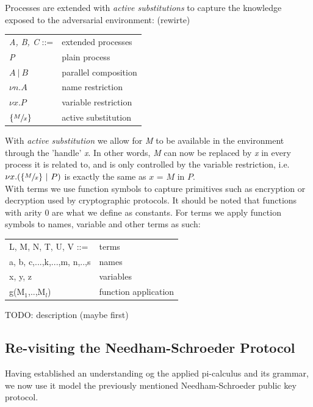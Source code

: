 Processes are extended with \textit{active substitutions} to capture the knowledge exposed to the
adversarial environment: (rewirte)
\begin{center}
	\begin{tabular} { l l }
 		\textit{A, B, C} ::= & extended processes \\ 
 		\textit{P} & plain process \\  
 		$A\ |\ B$ & parallel composition \\
		$\nu n.A$ & name restriction \\
		$\nu x.P$ & variable restriction \\
		$\{ \sfrac{M}{x} \}$ & active substitution
	\end{tabular}
\end{center}
With \textit{active substitution} we allow for \textit{M} to be available in the environment through the 'handle' \textit{x}. In other words, \textit{M} can now be replaced by \textit{x} in every process it is related to, and is only controlled by the variable restriction, i.e. $\nu x.(\{\sfrac{M}{x}\}\ |\ P)$ is exactly the same as $x$ = $M$ in $P.$\\ 

With terms we use function symbols to capture primitives such as encryption or decryption used by cryptographic protocols. It should be noted that functions with arity 0 are what we define as constants.
For terms we apply function symbols to names, variable and other terms as such: 
\begin{center}
	\begin{tabular} { l l }
 		L, M, N, T, U, V ::= & terms \\ 
 		a, b, c,...,k,...,m, n,..,s & names \\  
 		x, y, z & variables \\
 		g(M$_{1}$,..,M$_{l}$) & function application
	\end{tabular}
\end{center}
TODO: description (maybe first)

\subsection{Re-visiting the Needham-Schroeder Protocol}
Having established an understanding og the applied pi-calculus and its grammar, we now use it model the previously mentioned Needham-Schroeder public key protocol.\\

